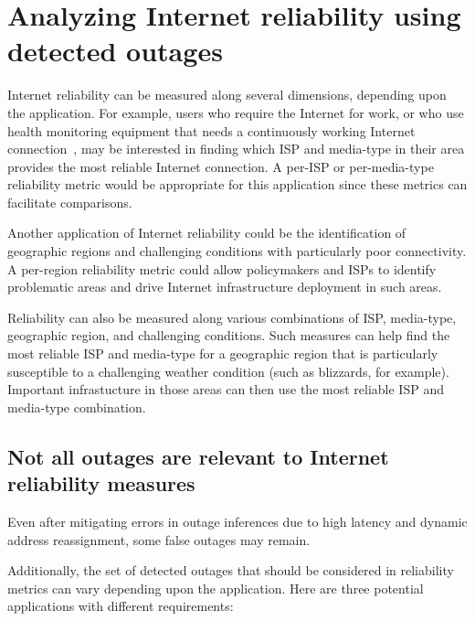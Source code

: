 

\section{Analyzing Internet reliability using detected outages}

Internet reliability can be measured along several dimensions,
depending upon the application. For example, users who require the
Internet for work, or who use health monitoring equipment that needs a
continuously working Internet connection~\cite{ideal-life,
remote-health-elderly}, may be interested in finding which ISP and
media-type in their area provides the most reliable Internet
connection. A per-ISP or per-media-type reliability metric would be
appropriate for this application since these metrics can facilitate
comparisons.

Another application of Internet reliability could be the
identification of geographic regions and challenging conditions with
particularly poor connectivity. A per-region reliability metric could
allow policymakers and ISPs to identify problematic areas and drive
Internet infrastructure deployment in such areas.

Reliability can also be measured along various combinations of ISP,
media-type, geographic region, and challenging conditions. Such
measures can help find the most reliable ISP and media-type for a
geographic region that is particularly susceptible to a challenging
weather condition (such as blizzards, for example). Important
infrastucture in those areas can then use the most reliable ISP and
media-type combination.

\subsection{Not all outages are relevant to Internet reliability
measures}

Even after mitigating errors in outage inferences due to high latency
and dynamic address reassignment, some false outages may
remain. 

Additionally, the set of detected outages that should be considered in
reliability metrics can vary depending upon the application. Here are
three potential applications with different requirements:

